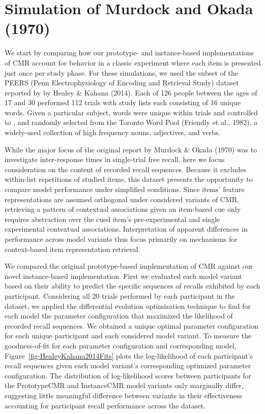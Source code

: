 \documentclass[
  letterpaper,
  DIV=11,
  numbers=noendperiod]{scrreport}
\begin{document}

\hypertarget{simulation-of-murdock-and-okada-1970}{%
\chapter{Simulation of Murdock and Okada
(1970)}\label{simulation-of-murdock-and-okada-1970}}

We start by comparing how our prototype- and instance-based
implementations of CMR account for behavior in a classic experiment
where each item is presented just once per study phase. For these
simulations, we used the subset of the PEERS (Penn Electrophysiology of
Encoding and Retrieval Study) dataset reported by by Healey \& Kahana
(2014). Each of 126 people between the ages of 17 and 30 performed 112
trials with study lists each consisting of 16 unique words. Given a
particular subject, words were unique within trials and controlled to ,
and randomly selected from the Toronto Word Pool (Friendly et al.,
1982), a widely-used collection of high frequency nouns, adjectives, and
verbs.

While the major focus of the original report by Murdock \& Okada (1970)
was to investigate inter-response times in single-trial free recall,
here we focus consideration on the content of recorded recall sequences.
Because it excludes within-list repetitions of studied items, this
dataset presents the opportunity to compare model performance under
simplified conditions. Since items' feature representations are assumed
orthogonal under considered variants of CMR, retrieving a pattern of
contextual associations given an item-based cue only requires
abstraction over the cued item's pre-experimental and single
experimental contextual associations. Interpretation of apparent
differences in performance across model variants thus focus primarily on
mechanisms for context-based item representation retrieval.

We compared the original prototype-based implementation of CMR against
our novel instance-based implementation. First we evaluated each model
variant based on their ability to predict the specific sequences of
recalls exhibited by each participant. Considering all 20 trials
performed by each participant in the dataset, we applied the
differential evolution optimization technique to find for each model the
parameter configuration that maximized the likelihood of recorded recall
sequences. We obtained a unique optimal parameter configuration for each
unique participant and each considered model variant. To measure the
goodness-of-fit for each parameter configuration and corresponding
model, Figure~\ref{fig-HealeyKahana2014Fits} plots the log-likelihood of
each participant's recall sequences given each model variant's
corresponding optimized parameter configuration. The distribution of
log-likelihood scores between participants for the PrototypeCMR and
InstanceCMR model variants only marginally differ, suggesting little
meaningful difference between variants in their effectiveness accounting
for participant recall performance across the dataset.
\end{document}
